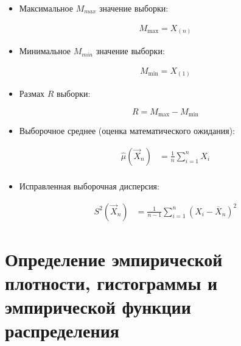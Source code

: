 \documentclass[a4paper,14pt, unknownkeysallowed]{extreport}
\begin{document}
\begin{itemize}

	\item Максимальное $M_{max}$ значение выборки:

	\begin{equation}
		\begin{aligned}
			M_{\max} = X_{(n)}
		\end{aligned}
	\end{equation}

	\item Минимальное $M_{min}$ значение выборки:

	\begin{equation}
		\begin{aligned}
			M_{\min} = X_{(1)}
		\end{aligned}
	\end{equation}

	\item Размах $R$ выборки:

	\begin{equation}
		R = M_{\max} - M_{\min}
	\end{equation}

    \item Выборочное среднее (оценка математического ожидания):

    \begin{equation}
        \begin{aligned}
        \hat\mu(\vec X_n) &= \frac 1n \sum_{i=1}^n X_i\\
        \end{aligned}
    \end{equation}
    
    \item Исправленная выборочная дисперсия:

    \begin{equation}
        \begin{aligned}
        S^2(\vec X_n) &= \frac 1{n-1} \sum_{i=1}^n (X_i-\overline X_n)^2
        \end{aligned}
    \end{equation}

\end{itemize}


\chapter{Определение эмпирической плотности, гистограммы и эмпирической функции распределения}
\end{document}
